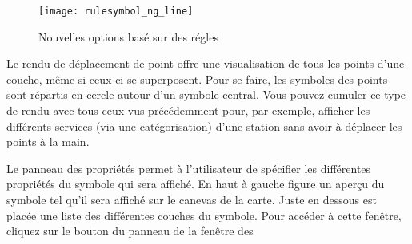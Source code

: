 \begin{figure}[ht]
   \centering
   \texttt{[image: rulesymbol\_ng\_line]}
   \caption{Nouvelles options basé sur des régles \nixcaption}\label{fig:rulesymNG}
\end{figure}


Le rendu de déplacement de point offre une visualisation de tous les points d'une couche, même si ceux-ci se superposent. Pour se faire, les symboles des points sont répartis en cercle autour d'un symbole central. Vous pouvez cumuler ce type de rendu avec tous ceux vus précédemment pour, par exemple, afficher les différents services (via une catégorisation) d'une station sans avoir à déplacer les points à la main.



Le panneau des propriétés permet à l'utilisateur de spécifier les différentes propriétés du symbole qui sera affiché. En haut à gauche figure un aperçu du symbole tel qu'il sera affiché sur le canevas de la carte. Juste en dessous est placée une liste des différentes couches du symbole. Pour accéder à cette fenêtre, cliquez sur le bouton  du panneau  de la fenêtre des 


